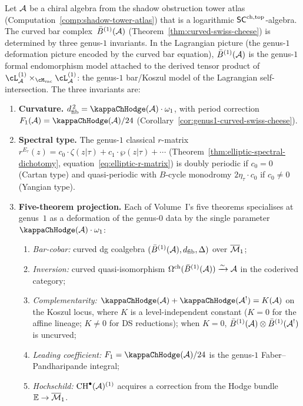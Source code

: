 \begin{theorem}%
\label{thm:genus1-endomorphism-atlas}%
%
Let\/ $\mathcal{A}$ be a chiral algebra from the shadow obstruction tower atlas
\textup{(}Computation~\textup{\ref{comp:shadow-tower-atlas}}\textup{)}
that is a logarithmic\/ $\mathsf{SC}^{\mathrm{ch,top}}$-algebra.
The curved bar complex~$\bar{B}^{(1)}(\mathcal{A})$
\textup{(}Theorem~\textup{\ref{thm:curved-swiss-cheese}}\textup{)}
is determined by three genus-$1$ invariants.
In the Lagrangian picture
\textup{(}the genus-$1$ deformation picture encoded by the curved bar
equation\textup{)},
$\bar{B}^{(1)}(\mathcal{A})$ is the genus-$1$ formal endomorphism model
attached to the derived tensor product of
$\cL_\cA^{(1)} \times_{\Mvac}
\cL_\cA^{(1)}$:
the genus-$1$ bar/Koszul model of the Lagrangian
self-intersection. The three invariants are:
\begin{enumerate}[label=\textup{(\roman*)}]
\item \textbf{Curvature.}
 $\dfib^{\,2} = \kappaChHodge(\cA) \cdot \omega_1$, with period
 correction
 $F_1(\cA) = \kappaChHodge(\cA)/24$
 \textup{(}Corollary~\textup{\ref{cor:genus1-curved-swiss-cheese}}\textup{)}.

\item \textbf{Spectral type.}
 The genus-$1$ classical $r$-matrix
 $r^{E_\tau}(z) = c_0 \cdot \zeta(z|\tau) + c_1 \cdot \wp(z|\tau)
 + \cdots$
 \textup{(}Theorem~\textup{\ref{thm:elliptic-spectral-dichotomy}},
 equation~\eqref{eq:elliptic-r-matrix}\textup{)}
 is doubly periodic if\/ $c_0 = 0$ \textup{(}Cartan type\textup{)}
 and quasi-periodic with $B$-cycle monodromy
 $2\eta_\tau \cdot c_0$ if\/ $c_0 \ne 0$
 \textup{(}Yangian type\textup{)}.

\item \textbf{Five-theorem projection.}
 Each of Volume~I's five theorems specialises at genus~$1$
 as a deformation of the genus-$0$ data by the single
 parameter $\kappaChHodge(\cA) \cdot \omega_1$:
 \begin{enumerate}[label=\textup{(\Alph*$_1$)},leftmargin=2.5em]
 \item \emph{Bar-cobar:} curved dg coalgebra
 $(\bar{B}^{(1)}(\mathcal{A}), d_{\mathrm{fib}}, \Delta)$ over $\overline{\mathcal{M}}_1$;
 \item \emph{Inversion:} curved quasi-isomorphism
 $\Omega^{\mathrm{ch}}(\bar{B}^{(1)}(\mathcal{A})) \xrightarrow{\sim} \mathcal{A}$
 in the coderived category;
 \item \emph{Complementarity:}
 $\kappaChHodge(\cA) + \kappaChHodge(\cA^!) = K(\cA)$ on the Koszul locus,
 where $K$ is a level-independent constant ($K = 0$ for the
 affine lineage; $K \neq 0$ for DS reductions);
 when $K = 0$, $\bar{B}^{(1)}(\mathcal{A}) \otimes \bar{B}^{(1)}(\mathcal{A}^!)$
 is uncurved;
 \item \emph{Leading coefficient:}
 $F_1 = \kappaChHodge(\cA)/24$ is the genus-$1$
 Faber--Pandharipande integral;
 \item \emph{Hochschild:}
 $\mathrm{CH}^\bullet(\mathcal{A})^{(1)}$ acquires a correction
 from the Hodge bundle
 $\mathbb{E} \to \overline{\mathcal{M}}_1$.
 \end{enumerate}
\end{enumerate}


\end{theorem}

